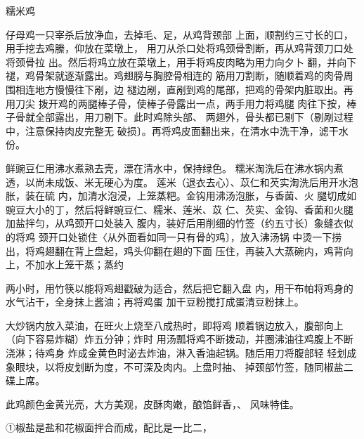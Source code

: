 \begin{recipe}[八宝糯米鸡]{糯米鸡}

\ingredients


\cooking

\step 仔母鸡一只宰杀后放净血，去掉毛、足，从鸡背颈部 上面，顺割约三寸长的口，用手挖去鸡縢，仰放在菜墩上， 用刀从杀口处将鸡颈骨割断，再从鸡背颈刀口处将颈骨拉 出。然后将鸡立放在菜墩上，用手将鸡皮肉略为用力向夕卜 翻，并向下褪，鸡骨架就逐渐露出。鸡翅膀与胸腔骨相连的 筋用刀割断，随顺着鸡的肉骨周围相连地方慢慢往下剐，边 褪边剐，直剐到鸡的尾部，把鸡的骨架内脏取出。再用刀尖 拨开鸡的两腿棒子骨，使棒子骨露出一点，两手用力将鸡腿 肉往下按，棒子骨就全部露出，用刀剔下。此时鸡除头部、 两翅外，骨头都已剔下（剔剐过程中，注意保持肉皮完整无 破损〕。再将鸡皮面翻出来，在清水中洗干净，滤干水份。

\step 鲜豌豆仁用沸水煮熟去壳，漂在清水中，保持绿色。 糯米淘洗后在沸水锅内煮透，以尚未成饭、米无硬心为度。 莲米（退衣去心）、苡仁和芡实淘洗后用开水泡胀，装在硫 内，加清水泡浸，上笼蒸粑。金钩用沸汤泡胀，与香菌、火 腿切成如豌豆大小的丁，然后将鲜豌豆仁、糯米、莲米、苡 仁、芡实、金钩、香菌和火腿加盐拌匀，从鸡颈开口处装入 腹内，装好后用削细的竹签（约五寸长）象缝衣似的将鸡 颈开口处锁住〈从外面看如同一只有骨的鸡〕，放入沸汤锅 中烫一下捞出，将鸡翅翻在背上盘起，鸡头仰翻在翅的下面 压住，再装入大蒸碗内，鸡背向上，不加水上笼干蒸；蒸约

两小时，用竹筷以能将鸡翅戳破为适合，然后把它翻入盘 内，用干布帕将鸡身的水气沾干，全身抹上酱油；再将鸡蛋 加干豆粉搅打成蛋清豆粉抹上。

\step 大炒锅内放入菜油，在旺火上烧至八成热时，即将鸡 顺着锅边放入，腹部向上（向下容易炸糊）炸五分钟；炸时 用汤瓢将鸡不断拨动，并圈沸油往鸡腹上不断浇淋；待鸡身 炸成金黄色时泌去炸油，淋入香油起锅。随后用刀将腹部轻 轻划成象眼块，以将皮划断为度，不可深及肉内。上盘时抽、 掉颈部竹签，随同椒盐二碟上席。

\notes

此鸡颜色金黄光亮，大方美观，皮酥肉嫩，酿馅鲜香，、 风味特佳。

①椒盐是盐和花椒面拌合而成，配比是一比二，

\end{recipe}

